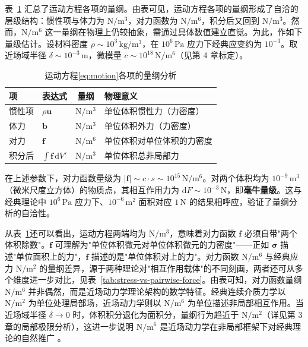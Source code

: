 表~\ref{tab:dim-analysis} 汇总了运动方程各项的量纲。由表可见，运动方程各项的量纲形成了自洽的层级结构：惯性项与体力为 $\mathrm{N}/\mathrm{m}^{3}$，对力函数为 $\mathrm{N}/\mathrm{m}^{6}$，积分后又回到 $\mathrm{N}/\mathrm{m}^{3}$。然而，$\mathrm{N}/\mathrm{m}^{6}$ 这一量纲在物理上仍较抽象，需通过具体数值建立直觉。为此，作如下量级估计。设材料密度 $\rho\sim 10^{3}\,\mathrm{kg}/\mathrm{m}^{3}$，在 $10^{6}\,\mathrm{Pa}$ 应力下经典应变约为 $10^{-3}$。取近场域半径 $\delta\sim 10^{-3}\,\mathrm{m}$，微模量 $c\sim 10^{18}\,\mathrm{N}/\mathrm{m}^{6}$（见第 4 章标定）。

\begin{table}[htbp]
  \centering
  \small
  \caption{运动方程\eqref{eq:motion}各项的量纲分析}
  \label{tab:dim-analysis}
  \begin{tabular}{llcl}
    \toprule
    项 & 表达式 & 量纲 & 物理意义 \\
    \midrule
    惯性项 & $\rho\ddot{\mathbf{u}}$ & $\mathrm{N}/\mathrm{m}^{3}$ & 单位体积惯性力（力密度）\\
    体力 & $\mathbf{b}$ & $\mathrm{N}/\mathrm{m}^{3}$ & 单位体积外力（力密度）\\
    对力 & $\mathbf{f}$ & $\mathrm{N}/\mathrm{m}^{6}$ & 单位体积对单位体积的力密度\\
    积分后 & $\int\mathbf{f}\,\mathrm{d}V'$ & $\mathrm{N}/\mathrm{m}^{3}$ & 单位体积总非局部力\\
    \bottomrule
  \end{tabular}
\end{table}



在上述参数下，对力函数量级为 \textbf{$|\mathbf{f}|\sim c\cdot s\sim 10^{15}\,\mathrm{N}/\mathrm{m}^{6}$}。对两个体积均为 $10^{-9}\,\mathrm{m}^{3}$（微米尺度立方体）的物质点，其相互作用力为 \textbf{$\mathrm{d}F\sim 10^{-3}\,\mathrm{N}$}，即\textbf{毫牛量级}。这与经典理论中 $10^{6}\,\mathrm{Pa}$ 应力下、$10^{-6}\,\mathrm{m}^{2}$ 面积对应 $1\,\mathrm{N}$ 的结果相呼应，验证了量纲分析的自洽性。

从表~\ref{tab:dim-analysis}还可以看出，运动方程两端均为 $\mathrm{N}/\mathrm{m}^{3}$，意味着对力函数 $\mathbf{f}$ 必须自带"两个体积除数"。$\mathbf{f}$ 可理解为"单位体积微元对单位体积微元的力密度"——正如 $\boldsymbol{\sigma}$ 描述"单位面积上的力"，$\mathbf{f}$ 描述的是"单位体积对上的力"。对力函数 $\mathrm{N}/\mathrm{m}^{6}$ 与经典应力 $\mathrm{N}/\mathrm{m}^{2}$ 的量纲差异，源于两种理论对"相互作用载体"的不同刻画，两者还可从多个维度进一步对比，见表~\ref{tab:stress-vs-pairwise-force}。由表可知，对力函数量纲 $\mathrm{N}/\mathrm{m}^{6}$ 并非偶然，而是近场动力学理论架构的数学特征。经典连续介质力学以 $\mathrm{N}/\mathrm{m}^{2}$ 为单位处理局部场，近场动力学则以 $\mathrm{N}/\mathrm{m}^{6}$ 为单位描述非局部相互作用。当近场域半径 $\delta\to 0$ 时，体积积分退化为面积分，量纲行为趋近于 $\mathrm{N}/\mathrm{m}^{2}$（详见第 3 章的局部极限分析），这进一步说明 $\mathrm{N}/\mathrm{m}^{6}$ 是近场动力学在非局部框架下对经典理论的自然推广 \cite{Silling2000,SillingLehoucq2010}。

